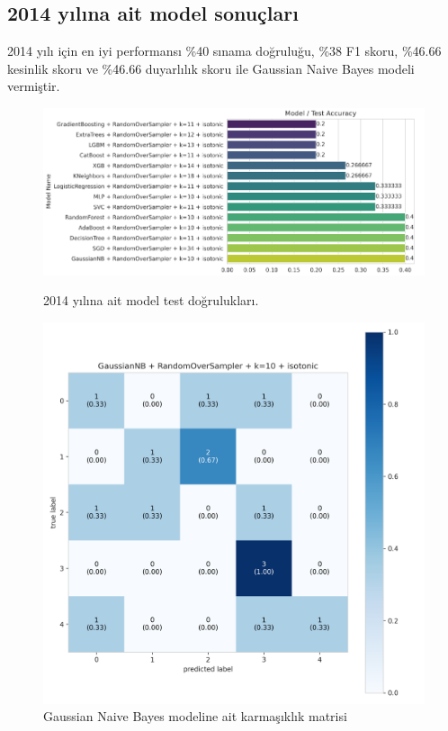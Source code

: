 \newpage

\subsection{2014 yılına ait model sonuçları}
2014 yılı için en iyi performansı \%40 sınama doğruluğu,  \%38 F1 skoru, \%46.66 kesinlik skoru ve \%46.66 duyarlılık skoru ile Gaussian Naive Bayes modeli vermiştir.

\begin{figure}[ht]
\centering
\begin{minipage}[b]{0.6\textwidth}
    \centering
    \includegraphics[width=\textwidth]{2014.png}
    \caption{2014 yılına ait model test doğrulukları.}
    \label{fig:resim1}
\end{minipage}
\hfill
\begin{minipage}[b]{0.6\textwidth}
    \centering
    \includegraphics[width=\textwidth]{2014_cm.png}
    \caption{Gaussian Naive Bayes modeline ait karmaşıklık matrisi}
    \label{fig:resim2}
\end{minipage}
\end{figure}

